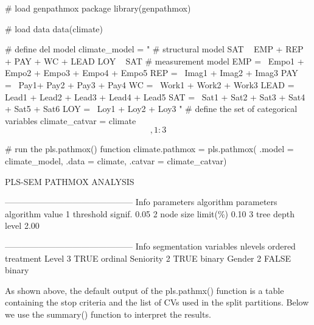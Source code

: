 \begin{example}
\# load genpathmox package library(genpathmox)

\# load data data(climate)

\# define del model climate\_model = " \# structural model SAT ~ EMP +
REP + PAY + WC + LEAD LOY ~ SAT \# measurement model EMP =~ Empo1 +
Empo2 + Empo3 + Empo4 + Empo5 REP =~ Imag1 + Imag2 + Imag3 PAY =~ Pay1+
Pay2 + Pay3 + Pay4 WC =~ Work1 + Work2 + Work3 LEAD =~ Lead1 + Lead2 +
Lead3 + Lead4 + Lead5 SAT =~ Sat1 + Sat2 + Sat3 + Sat4 + Sat5 + Sat6 LOY
=~ Loy1 + Loy2 + Loy3 " \# define the set of categorical variables
climate\_catvar = climate\[,1:3\]

\# run the pls.pathmox() function climate.pathmox = pls.pathmox( .model
= climate\_model, .data = climate, .catvar = climate\_catvar)

PLS-SEM PATHMOX ANALYSIS

--------------------------------------------- Info parameters algorithm
parameters algorithm value 1 threshold signif. 0.05 2 node size limit(\%)
0.10 3 tree depth level 2.00

--------------------------------------------- Info segmentation
variables nlevels ordered treatment Level 3 TRUE ordinal Seniority 2
TRUE binary Gender 2 FALSE binary
\end{example}

As shown above, the default output of the pls.pathmx() function is a
table containing the stop criteria and the list of CVs used in the split
partitions. Below we use the summary() function to interpret the
results.

